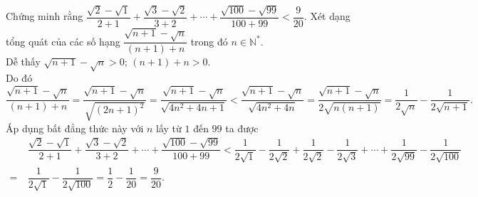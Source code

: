\begin{bt}%
	Chứng minh rằng $\dfrac{\sqrt{2} - \sqrt{1}}{2 + 1} + \dfrac{\sqrt{3} - \sqrt{2}}{3 + 2} + \cdots + \dfrac{\sqrt{100} - \sqrt{99}}{100 + 99}<\dfrac{9}{20}.$
	\loigiai
	{
	Xét dạng tổng quát của các số hạng $\dfrac{\sqrt{n + 1} - \sqrt{n}}{(n + 1) + n}$ trong đó $n \in \mathbb{N}^*$.\\
	Dễ thấy $\sqrt{n + 1} - \sqrt{n}>0 ;\, (n + 1) + n>0$.\\ Do đó 
	\[\dfrac{\sqrt{n + 1} - \sqrt{n}}{(n + 1) + n}=\dfrac{\sqrt{n + 1} - \sqrt{n}}{\sqrt{(2n + 1)^2}}=\dfrac{\sqrt{n + 1} - \sqrt{n}}{\sqrt{4n^2 + 4n + 1}}<\dfrac{\sqrt{n + 1} - \sqrt{n}}{\sqrt{4n^2 + 4n}}=\dfrac{\sqrt{n + 1} - \sqrt{n}}{2\sqrt{n(n + 1)}}=\dfrac{1}{2\sqrt{n}} - \dfrac{1}{2\sqrt{n + 1}}.\]
	Áp dụng bất đẳng thức này với $n$ lấy từ $1$ đến $99$ ta được
	\allowdisplaybreaks 
	\begin{align*}
	&\ \dfrac{\sqrt{2}-\sqrt{1}}{2+1}+\dfrac{\sqrt{3}-\sqrt{2}}{3+2}+\cdots+\dfrac{\sqrt{100}-\sqrt{99}}{100+99}<\dfrac{1}{2 \sqrt{1}}-\dfrac{1}{2 \sqrt{2}}+\dfrac{1}{2 \sqrt{2}}-\dfrac{1}{2 \sqrt{3}}+\cdots+\dfrac{1}{2 \sqrt{99}}-\dfrac{1}{2 \sqrt{100}}\\
	=&\ \dfrac{1}{2 \sqrt{1}}-\dfrac{1}{2 \sqrt{100}}=\dfrac{1}{2}-\dfrac{1}{20}=\dfrac{9}{20}.
	\end{align*}
	}
\end{bt}